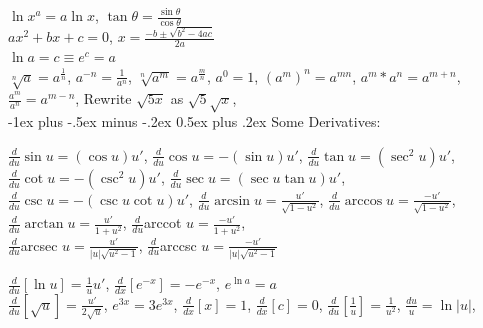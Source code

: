 \documentclass[10pt,landscape]{article}
\makeatletter
\renewcommand{\section}{\@startsection{section}{1}{0mm}%
                                {-1ex plus -.5ex minus -.2ex}%
                                {0.5ex plus .2ex}%
                                {\normalfont\large\bfseries}}
\makeatother
\begin{document}
\begin{multicols}{3}
$\ln x^a = a \ln x$, $\tan \theta = \frac{\sin \theta}{\cos \theta}$\\

$ax^2+bx+c = 0$, $x= \frac{-b \pm \sqrt{b^2-4ac}}{2a}$\\

$\ln a = c \equiv e^c = a$\\

$\sqrt[n]{a} = a^\frac{1}{n}$, $a^{-n} = \frac{1}{a^n}$, $\sqrt[n]{a^m} = a^\frac{m}{n}$, $a^0 = 1$, $\left( a^m \right)^n = a^{mn}$, 
$a^m * a^n = a^{m + n}$, $\frac{ a^m }{ a^n } = a^{m-n}$, Rewrite $\sqrt{5x}$ as $\sqrt{5} \sqrt{x}$, \\





\section{Some Derivatives:}

$\frac{d}{du} \sin u = (\cos u)u'$, $\frac{d}{du} \cos u = -(\sin u)u'$, $\frac{d}{du} \tan u = (\sec^2 u)u'$,
$\frac{d}{du} \cot u = -(\csc^2 u)u'$, $\frac{d}{du} \sec u = (\sec u \tan u)u'$, $\frac{d}{du} \csc u = -(\csc u \cot u)u'$,
$\frac{d}{du} \arcsin u = \frac{u'}{\sqrt{1 - u^2}}$, $\frac{d}{du} \arccos u = \frac{-u'}{\sqrt{1 - u^2}}$,
$\frac{d}{du} \arctan u = \frac{u'}{1 + u^2}$, $\frac{d}{du} $arccot $ u = \frac{-u'}{1 + u^2}$, \\
$\frac{d}{du} $arcsec $ u = \frac{u'}{|u|\sqrt{u^2 - 1}}$,
$\frac{d}{du} $arccsc $ u = \frac{-u'}{|u|\sqrt{u^2 - 1}}$

$\frac{d}{du}[\ln{u}] = \frac{1}{u}u'$, $\frac{d}{dx}[e^{-x}] = -e^{-x}$, $e^{\ln a} = a$ \\
$\frac{d}{du}[\sqrt{u}] = \frac{u'}{2 \sqrt{u}}$, $e^{3x} = 3e^{3x}$, $\frac{d}{dx}\left[ x \right] = 1$, $\frac{d}{dx}\left[ c \right] = 0$, 
$\frac{d}{du}[ \frac{1}{u} ] = \frac{1}{u^2}$, $\frac{du}{u} = \ln |u|$,



\end{multicols}
\end{document}
